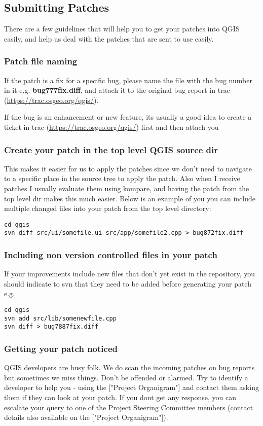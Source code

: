 \subsection{Submitting Patches}
There are a few guidelines that will help you to get your patches into QGIS
easily, and help us deal with the patches that are sent to use easily.

\subsubsection{Patch file naming}
If the patch is a fix for a specific bug, please name the file with the bug
number in it e.g.  \textbf{bug777fix.diff}, and attach it to the original bug report
in trac (\url{https://trac.osgeo.org/qgis/}).

If the bug is an enhancement or new feature, its usually a good idea to create
a ticket in trac (\url{https://trac.osgeo.org/qgis/}) first and then attach you 

\subsubsection{Create your patch in the top level QGIS source dir}
This makes it easier for us to apply the patches since we don't need to
navigate to a specific place in the source tree to apply the patch. Also when I
receive patches I usually evaluate them using kompare, and having the patch
from the top level dir makes this much easier. Below is an example of you you
can include multiple changed files into your patch from the top level
directory:

\begin{verbatim}
cd qgis
svn diff src/ui/somefile.ui src/app/somefile2.cpp > bug872fix.diff
\end{verbatim}

\subsubsection{Including non version controlled files in your patch}
If your improvements include new files that don't yet exist in the repository,
you should indicate to svn that they need to be added before generating your
patch e.g.

\begin{verbatim}
cd qgis
svn add src/lib/somenewfile.cpp
svn diff > bug7887fix.diff
\end{verbatim}

\subsubsection{Getting your patch noticed}
QGIS developers are busy folk. We do scan the incoming patches on bug reports
but sometimes we miss things.  Don't be offended or alarmed. Try to identify a
developer to help you - using the ["Project Organigram"] and contact them
asking them if they can look at your patch. If you dont get any response, you
can escalate your query to one of the Project Steering Committee members
(contact details also available on the ["Project Organigram"]).

